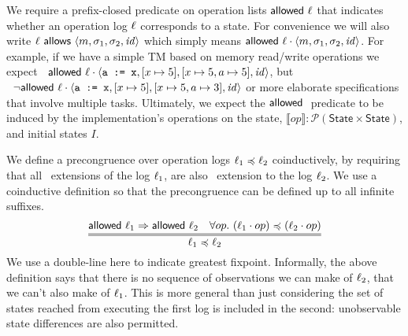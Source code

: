 We require a prefix-closed predicate on operation lists $\textsf{allowed}\ \ell$
that indicates whether an operation log $\ell$ corresponds to a state.
%
For convenience we will also write $\ell \textsf{ allows } \langle m, \sigma_1,
\sigma_2, \mathit{id}\rangle$ which simply means 
$\textsf{allowed}\ \ell \cdot \langle m, \sigma_1,\sigma_2, \mathit{id}\rangle$.
%
For example, if we have a simple TM
based on memory read/write operations we expect
$\;\;\textsf{allowed}\ \ell\cdot \langle \texttt{a := x}, [x \mapsto 5], [x
  \mapsto 5, a \mapsto 5], \mathit{id}\rangle$,
but 
$\;\;\neg \textsf{allowed}\ \ell\cdot \langle \texttt{a := x}, [x \mapsto 5], [x
  \mapsto 5, a \mapsto 3], \mathit{id}\rangle$ or more elaborate
specifications that involve multiple tasks.
%
Ultimately, we expect the $\textsf{allowed}\ $ predicate to be induced by the
implementation's operations on the state, $\llbracket op\rrbracket :
\mathcal{P}(\mathsf{State} \times \mathsf{State})$, and initial
states $I$. 

We define a precongruence over operation logs $\ell_1 \preccurlyeq \ell_2$
coinductively, by requiring that all \allowedt\ extensions of the log $\ell_1$, are also \allowedt\ extension to the log $\ell_2$. 
We use a coinductive definition so that the precongruence can be
defined up to all infinite suffixes.
$$
\infer={\OPL_1 \opeq \OPL_2} 
   {  \allowed{\OPL_1} \Rightarrow \allowed{\OPL_2}
     & \forall \op.\   (\OPL_1 \cdot \op) \opeq (\OPL_2 \cdot \op)}
$$
We use a double-line here to indicate greatest fixpoint.
%
Informally, the above definition says that 
there is no sequence of observations we can make of $\ell_2$, that we can't also make of $\ell_1$. 
This is more general than just considering the set of states reached from executing the first log is included in the second:
unobservable state differences are also permitted. 



